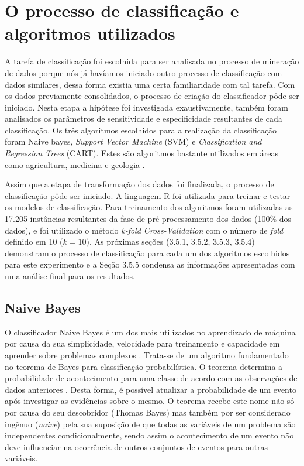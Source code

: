 \section{O processo de classificação e algoritmos utilizados}

A tarefa de classificação foi escolhida para ser analisada no processo de mineração de dados porque nós já havíamos iniciado outro processo de classificação com dados similares, dessa forma existia uma certa familiaridade com tal tarefa. Com os dados previamente consolidados, o processo de criação do classificador pôde ser iniciado. Nesta etapa a hipótese foi investigada exaustivamente, também foram analisados os parâmetros de sensitividade e especificidade resultantes de cada classificação. Os três algoritmos escolhidos para a realização da classificação foram Naive bayes, \textit{Support Vector Machine} (SVM) e \textit{Classification and Regression Trees} (CART). Estes são algoritmos bastante utilizados em áreas como agricultura, medicina e geologia \cite{dong2014nonlinear}.

Assim que a etapa de transformação dos dados foi finalizada, o processo de classificação pôde ser iniciado. A linguagem R foi utilizada para treinar e testar os modelos de classificação. Para treinamento dos algoritmos foram utilizadas as 17.205 instâncias resultantes da fase de pré-processamento dos dados (100\% dos dados), e foi utilizado o método \textit{k-fold Cross-Validation} com o número de \textit{fold} definido em 10 ($k = 10$). As próximas seções (3.5.1, 3.5.2, 3.5.3, 3.5.4) demonstram o processo de classificação para cada um dos algoritmos escolhidos para este experimento e a Seção 3.5.5 condensa as informações apresentadas com uma análise final para os resultados.

\subsection{Naive Bayes}
O classificador Naive Bayes é um dos mais utilizados no aprendizado de máquina por causa da sua simplicidade, velocidade para treinamento e capacidade em aprender sobre problemas complexos \cite{dong2014nonlinear,zhang2004optimality,chakrabarti2002mining}. Trata-se de um algoritmo fundamentado no teorema de Bayes para classificação probabilística. O teorema determina a probabilidade de acontecimento para uma classe de acordo com as observações de dados anteriores \cite{Aggarwal2015}. Desta forma, é possível atualizar a probabilidade de um evento após investigar as evidências sobre o mesmo. O teorema recebe este nome não só por causa do seu descobridor (Thomas Bayes) mas também por ser considerado ingênuo (\textit{naive}) pela sua suposição de que todas as variáveis de um problema são independentes condicionalmente, sendo assim o acontecimento de um evento não deve influenciar na ocorrência de outros conjuntos de eventos para outras variáveis.

